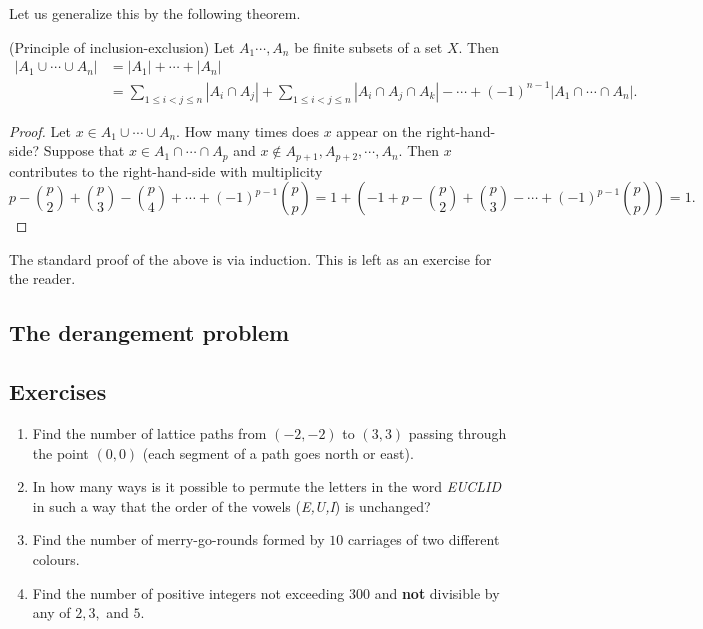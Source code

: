 Let us generalize this by the following theorem.

\begin{theorem}(Principle of inclusion-exclusion)
Let $A_1\cdots, A_n$ be finite subsets of a set $X$. Then 
\begin{align*}
|A_1 \cup \cdots \cup A_n|&=|A_1|+\cdots+|A_n|\\
&=\sum_{1 \leq i < j \leq n} |A_i \cap A_j|+\sum_{1 \leq i < j \leq n} |A_i \cap A_j \cap A_k| - \cdots + (-1)^{n-1}|A_1 \cap \cdots \cap A_n|.
\end{align*}
\end{theorem}

\begin{proof}
Let $x \in A_1 \cup \cdots \cup A_n$. How many times does $x$ appear on the right-hand-side? Suppose that $x \in A_1 \cap \cdots \cap A_p$ and 
$x \notin A_{p+1}, A_{p+2}, \cdots, A_n$. Then $x$ contributes to the right-hand-side with multiplicity 
$$
p- {p \choose 2} + {p \choose 3} - {p \choose 4} + \cdots + (-1)^{p-1} {p \choose p}=1+(-1 +p- {p \choose 2} + {p \choose 3} - \cdots + (-1)^{p-1} {p \choose p})=1.
$$
\end{proof}

The standard proof of the above is via induction. This is left as an exercise for the reader.

\subsection{The derangement problem}

\subsection{Exercises}

\begin{enumerate}
    \item Find the number of lattice paths from $(-2, -2)$ to $(3,3)$ passing through the point $(0,0)$ (each segment of a path goes north or east).
    \item In how many ways is it possible to permute the letters in the word \textit{EUCLID} in such a way that the order of the vowels (\textit{E,U,I}) is unchanged?
    \item Find the number of merry-go-rounds formed by $10$ carriages of two different colours.
    \item Find the number of positive integers not exceeding $300$ and \textbf{not} divisible by any of $2,3,$ and $5$.
\end{enumerate}